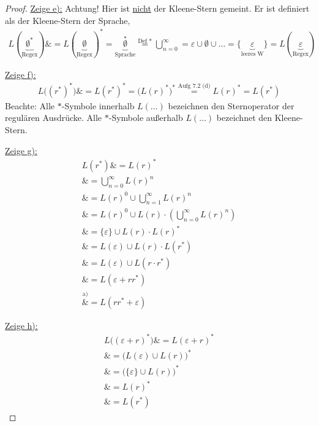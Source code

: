 \documentclass[12pt,a4paper]{article}
\begin{document}
\begin{proof}
	\underline{Zeige e):}
	Achtung! Hier ist \underline{nicht} der Kleene-Stern gemeint. 
	Er ist definiert als der Kleene-Stern der Sprache,
	\begin{align*}
		L(\underbrace{\emptyset^\ast}_{\text{Regex}})
		\overset{\text{}}&=
		L(\underbrace{\emptyset}_{\text{Regex}})^\ast
		\overset{\text{}}=
		\underbrace{\emptyset}_{\text{Sprache}}^\ast
		\overset{\text{Def }\ast}=
		\bigcup\limits_{n=0}^\infty
		\overset{\text{}}=
		\varepsilon\cup\emptyset\cup\ldots
		\overset{\text{}}=
		\lbrace\underbrace{\varepsilon}_{\text{leeres W}}\rbrace
		\overset{\text{}}=
		L(\underbrace{\varepsilon}_{\text{Regex}})
	\end{align*}
	
	\underline{Zeige f):}
	\begin{align*}
		L\big((r^\ast)^\ast\big)
		\overset{\text{}}&=
		L(r^\ast)^\ast
		\overset{\text{}}=
		\big(L(r)^\ast\big)^\ast
		\overset{\text{Aufg 7.2 (d)}}=
		L(r)^\ast
		\overset{\text{}}=
		L(r^\ast)
	\end{align*}
	Beachte: Alle $\ast$-Symbole innerhalb $L(\ldots)$ bezeichnen den Sternoperator der regulären Ausdrücke.
	Alle $\ast$-Symbole außerhalb $L(\ldots)$ bezeichnet den Kleene-Stern.
	
	\underline{Zeige g):}
	\begin{align*}
		L(r^\ast)
		\overset{\text{}}&=
		L(r)^\ast\\
		\overset{\text{}}&=
		\bigcup\limits_{n=0}^\infty L(r)^n\\
		\overset{\text{}}&=
		L(r)^0\cup\bigcup\limits_{n=1}^\infty L(r)^n\\
		\overset{\text{}}&=
		L(r)^0\cup L(r)\cdot\left(\bigcup\limits_{n=0}^\infty L(r)^n\right)\\
		\overset{\text{}}&=
		\lbrace\varepsilon\rbrace\cup L(r)\cdot L(r)^\ast\\
		\overset{\text{}}&=
		L(\varepsilon)\cup L(r)\cdot L(r^\ast)\\
		\overset{\text{}}&=
		L(\varepsilon)\cup L(r\cdot r^\ast)\\
		\overset{\text{}}&=
		L(\varepsilon+rr^\ast)\\
		\overset{\text{a)}}&=
		L(rr^\ast+\varepsilon)
	\end{align*}
	
	\underline{Zeige h):}
	\begin{align*}
		L\big((\varepsilon+r)^\ast\big)
		\overset{\text{}}&=
		L(\varepsilon+r)^\ast\\
		\overset{\text{}}&=
		\big(L(\varepsilon)\cup L(r)\big)^\ast\\
		\overset{\text{}}&=
		\big(\lbrace\varepsilon\rbrace\cup L(r)\big)^\ast\\
		\overset{\text{}}&=
		L(r)^\ast\\
		\overset{\text{}}&=
		L(r^\ast)
	\end{align*}
\end{proof}
\end{document}
